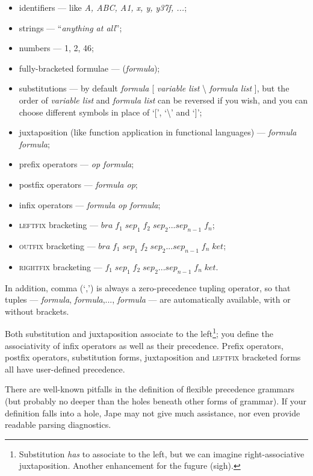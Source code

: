 \begin{itemize}
\item identifiers --- like \textit{A, ABC, A1, x, y, y37f, ...};
\item strings --- ``\textit{anything at all}''; 
\item numbers --- 1, 2, 46;
\item fully-bracketed formulae --- (\textit{formula});
\item substitutions --- by default \textit{formula} [ \textit{variable list} {\textbackslash} \textit{formula list} ], but the order of \textit{variable list} and \textit{formula list} can be reversed if you wish, and you can choose different symbols in place of `[', `{\textbackslash}' and `]';
\item juxtaposition (like function application in functional languages) --- \textit{formula formula};
\item prefix operators --- \textit{op formula};
\item postfix operators --- \textit{formula op};
\item infix operators --- \textit{formula op formula};
\item \textsc{leftfix} bracketing --- $\textit{bra}\; f_{1} \;\textit{sep}_{1} \;f_{2} \;\textit{sep}_{2} ... \textit{sep}_{n-1} \;f_{n}$;
\item \textsc{outfix} bracketing --- $\textit{bra}\; f_{1} \;\textit{sep}_{1} \;f_{2} \;\textit{sep}_{2} ... \textit{sep}_{n-1} \;f_{n} \; ket$;
\item \textsc{rightfix} bracketing --- $f_{1} \;\textit{sep}_{1} \;f_{2} \;\textit{sep}_{2} ... \textit{sep}_{n-1} \;f_{n} \; ket$.
\end{itemize}

In addition, comma (`,') is always a zero-precedence tupling operator, so that tuples --- \textit{formula}, \textit{formula},..., \textit{formula} --- are automatically available, with or without brackets.

Both substitution and juxtaposition associate to the left\footnote{Substitution \textit{has} to associate to the left, but we can imagine right-associative juxtaposition. Another enhancement for the fugure (sigh).}; you define the associativity of infix operators as well as their precedence. Prefix operators, postfix operators, substitution forms, juxtaposition and \textsc{leftfix} bracketed forms all have user-defined precedence.

There are well-known pitfalls in the definition of flexible precedence grammars (but probably no deeper than the holes beneath other forms of grammar). If your definition falls into a hole, Jape may not give much assistance, nor even provide readable parsing diagnostics.

